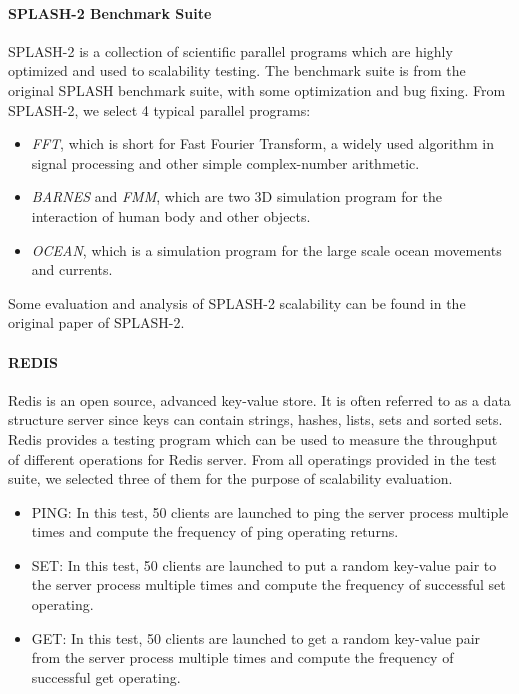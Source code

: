 \paragraph{SPLASH-2 Benchmark Suite\cite{rel:splash2}}
SPLASH-2 is a collection of scientific parallel programs which are highly 
optimized and used to scalability testing. The benchmark suite is from the original
SPLASH benchmark suite, with some optimization and bug fixing. From SPLASH-2, 
we select 4 typical parallel programs:
\begin{itemize}
\item \emph{FFT}, which is short for Fast Fourier Transform, a widely used
algorithm in signal processing and other simple complex-number arithmetic. 
\item \emph{BARNES} and \emph{FMM}, which are two 3D simulation program for the 
interaction of human body and other objects.
\item \emph{OCEAN}, which is a simulation program for the large scale 
ocean movements and currents. 
\end{itemize}
Some evaluation and analysis of SPLASH-2 scalability can be found in the original
paper of SPLASH-2\cite{rel:steven}.

\paragraph{REDIS \cite{rel:redisweb}} 
Redis is an open source, advanced key-value store. 
It is often referred to as a data structure server since keys can contain strings, 
hashes, lists, sets and sorted sets. Redis provides a testing program which can be
used to measure the throughput of different operations for Redis server. From all
operatings provided in the test suite, we selected three of them for the purpose 
of scalability evaluation.
\begin{itemize}
\item PING: In this test, 50 clients are launched to ping the server process
multiple times and compute the frequency of ping operating returns.
\item SET: In this test, 50 clients are launched to put a random key-value pair
to the server process multiple times and compute the frequency of successful set 
operating. 
\item GET: In this test, 50 clients are launched to get a random key-value pair
from the server process multiple times and compute the frequency of successful get
operating. 
\end{itemize}

